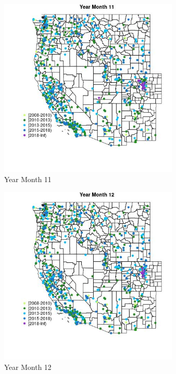 \begin{figure} 
\centering  
\includegraphics[width=0.77\textwidth]{Code_Outputs/Report_ML_input_PM25_Step4_part_e_de_duplicated_aveswNAs_MapObsMo11Year.jpg} 
\caption{\label{fig:Report_ML_input_PM25_Step4_part_e_de_duplicated_aveswNAsMapObsMo11Year}Year Month 11} 
\end{figure} 
 

\begin{figure} 
\centering  
\includegraphics[width=0.77\textwidth]{Code_Outputs/Report_ML_input_PM25_Step4_part_e_de_duplicated_aveswNAs_MapObsMo12Year.jpg} 
\caption{\label{fig:Report_ML_input_PM25_Step4_part_e_de_duplicated_aveswNAsMapObsMo12Year}Year Month 12} 
\end{figure} 
 

